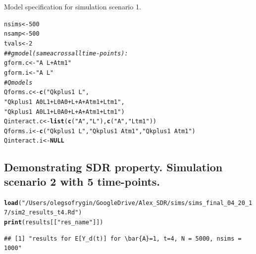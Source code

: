\documentclass{article}\usepackage[]{graphicx}\usepackage[]{color}
\makeatletter
\newcommand{\hlnum}[1]{\textcolor[rgb]{0.686,0.059,0.569}{#1}}%
\newcommand{\hlstr}[1]{\textcolor[rgb]{0.192,0.494,0.8}{#1}}%
\newcommand{\hlcom}[1]{\textcolor[rgb]{0.678,0.584,0.686}{\textit{#1}}}%
\newcommand{\hlstd}[1]{\textcolor[rgb]{0.345,0.345,0.345}{#1}}%
\newcommand{\hlkwa}[1]{\textcolor[rgb]{0.161,0.373,0.58}{\textbf{#1}}}%
\newcommand{\hlkwb}[1]{\textcolor[rgb]{0.69,0.353,0.396}{#1}}%
\newcommand{\hlkwd}[1]{\textcolor[rgb]{0.737,0.353,0.396}{\textbf{#1}}}%
\newenvironment{kframe}{%
 \def\at@end@of@kframe{}%
 \ifinner\ifhmode%
  \def\at@end@of@kframe{\end{minipage}}%
  \begin{minipage}{\columnwidth}%
 \fi\fi%
 \def\FrameCommand##1{\hskip\@totalleftmargin \hskip-\fboxsep
 \colorbox{shadecolor}{##1}\hskip-\fboxsep
     \hskip-\linewidth \hskip-\@totalleftmargin \hskip\columnwidth}%
 \MakeFramed {\advance\hsize-\width
   \@totalleftmargin\z@ \linewidth\hsize
   \@setminipage}}%
 {\par\unskip\endMakeFramed%
 \at@end@of@kframe}
\newenvironment{knitrout}{}{} %
\makeatother
\begin{document}
Model specification for simulation scenario 1.

\begin{knitrout}
\color{fgcolor}\begin{kframe}
\begin{alltt}
\hlstd{nsims} \hlkwb{<-} \hlnum{500}
\hlstd{nsamp} \hlkwb{<-} \hlnum{500}
\hlstd{tvals} \hlkwb{<-} \hlnum{2}
\hlcom{## g model (same across all time-points):}
\hlstd{gform.c} \hlkwb{<-} \hlstr{"A ~ L + Atm1"}
\hlstd{gform.i} \hlkwb{<-} \hlstr{"A ~ L"}
\hlcom{# Q models}
\hlstd{Qforms.c} \hlkwb{<-} \hlkwd{c}\hlstd{(}\hlstr{"Qkplus1 ~ L"}\hlstd{,}
              \hlstr{"Qkplus1 ~ A0L1 + L0A0 + L + A + Atm1 + Ltm1"}\hlstd{,}
              \hlstr{"Qkplus1 ~ A0L1 + L0A0 + L + A + Atm1 + Ltm1"}\hlstd{)}
\hlstd{Qinteract.c} \hlkwb{<-} \hlkwd{list}\hlstd{(}\hlkwd{c}\hlstd{(}\hlstr{"A"}\hlstd{,} \hlstr{"L"}\hlstd{),} \hlkwd{c}\hlstd{(}\hlstr{"A"}\hlstd{,} \hlstr{"Ltm1"}\hlstd{))}
\hlstd{Qforms.i} \hlkwb{<-} \hlkwd{c}\hlstd{(}\hlstr{"Qkplus1 ~ L"}\hlstd{,} \hlstr{"Qkplus1 ~ Atm1"}\hlstd{,} \hlstr{"Qkplus1 ~ Atm1"}\hlstd{)}
\hlstd{Qinteract.i} \hlkwb{<-} \hlkwa{NULL}
\end{alltt}
\end{kframe}
\end{knitrout}

\clearpage
\subsection{Demonstrating SDR property. Simulation scenario 2 with 5 time-points.}

\begin{knitrout}
\color{fgcolor}\begin{kframe}
\begin{alltt}
\hlkwd{load}\hlstd{(}\hlstr{"/Users/olegsofrygin/GoogleDrive/Alex_SDR/sims/sims_final_04_20_17/sim2_results_t4.Rd"}\hlstd{)}
\hlkwd{print}\hlstd{(results[[}\hlstr{"res_name"}\hlstd{]])}
\end{alltt}
\begin{verbatim}
## [1] "results for E[Y_d(t)] for \bar{A}=1, t=4, N = 5000, nsims = 1000"
\end{verbatim}
\end{kframe}
\end{knitrout}
\end{document}
